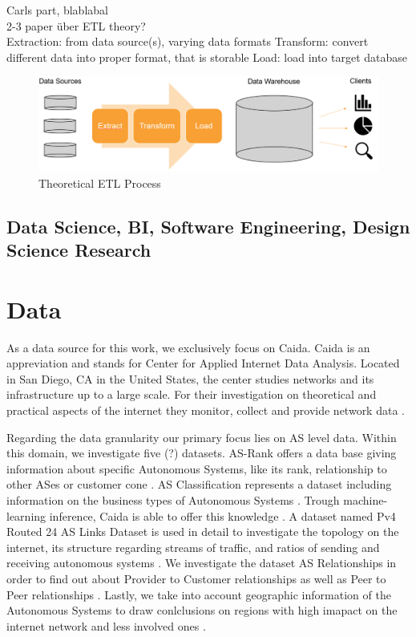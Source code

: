 \documentclass[conference, 11pt]{IEEEtran}
\begin{document}
Carls part, blablabal \\ 

2-3 paper über ETL theory? \\


Extraction: from data source(s), varying data formats
Transform: convert different data into proper format, that is storable
Load: load into target database




\begin{figure}[htbp]
\centerline{\includegraphics[scale=0.3]{Graphics/ETLTheory.PNG}}
\caption{Theoretical ETL Process}
\label{fig}
\end{figure}

\subsection{Data Science, BI, Software Engineering, Design Science Research} 



\section{Data}
As a data source for this work, we exclusively focus on Caida. Caida is an appreviation and stands for Center for Applied Internet Data Analysis. Located in San Diego, CA in the United States, the center studies networks and its infrastructure up to a large scale. For their investigation on theoretical and practical aspects of the internet they monitor, collect and provide network data \cite{Caida}. 

Regarding the data granularity our primary focus lies on AS level data. Within this domain, we investigate five (?) datasets. AS-Rank offers a data base giving information about specific Autonomous Systems, like its rank, relationship to other ASes or customer cone  \cite{Rank} . AS Classification represents a dataset including information on the business types of Autonomous Systems \cite{Classification}. Trough machine-learning inference, Caida is able to offer this knowledge  \cite{Classification}. A dataset named Pv4 Routed 24 AS Links Dataset is used in detail to investigate the topology on the internet, its structure regarding streams of traffic, and ratios of sending and receiving autonomous systems  \cite{IPv4Data}. 
We investigate the dataset AS Relationships in order to find out about Provider to Customer relationships as well as Peer to Peer relationships \cite{CaidaRelationshipsData}.  Lastly, we take into account geographic information of the Autonomous Systems to draw conlclusions on regions with high imapact on the internet network and less involved ones  \cite{CaidaGeoData}. 
\end{document}
